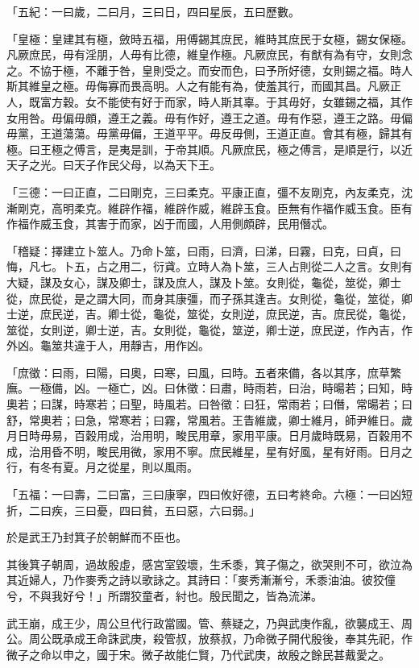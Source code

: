 \begin{pinyinscope}
「五紀：一曰歲，二曰月，三曰日，四曰星辰，五曰歷數。

「皇極：皇建其有極，斂時五福，用傅錫其庶民，維時其庶民于女極，錫女保極。凡厥庶民，毋有淫朋，人毋有比德，維皇作極。凡厥庶民，有猷有為有守，女則念之。不協于極，不離于咎，皇則受之。而安而色，曰予所好德，女則錫之福。時人斯其維皇之極。毋侮寡而畏高明。人之有能有為，使羞其行，而國其昌。凡厥正人，既富方穀。女不能使有好于而家，時人斯其辜。于其毋好，女雖錫之福，其作女用咎。毋偏毋頗，遵王之義。毋有作好，遵王之道。毋有作惡，遵王之路。毋偏毋黨，王道蕩蕩。毋黨毋偏，王道平平。毋反毋側，王道正直。會其有極，歸其有極。曰王極之傅言，是夷是訓，于帝其順。凡厥庶民，極之傅言，是順是行，以近天子之光。曰天子作民父母，以為天下王。

「三德：一曰正直，二曰剛克，三曰柔克。平康正直，彊不友剛克，內友柔克，沈漸剛克，高明柔克。維辟作福，維辟作威，維辟玉食。臣無有作福作威玉食。臣有作福作威玉食，其害于而家，凶于而國，人用側頗辟，民用僭忒。

「稽疑：擇建立卜筮人。乃命卜筮，曰雨，曰濟，曰涕，曰霧，曰克，曰貞，曰悔，凡七。卜五，占之用二，衍貣。立時人為卜筮，三人占則從二人之言。女則有大疑，謀及女心，謀及卿士，謀及庶人，謀及卜筮。女則從，龜從，筮從，卿士從，庶民從，是之謂大同，而身其康彊，而子孫其逢吉。女則從，龜從，筮從，卿士逆，庶民逆，吉。卿士從，龜從，筮從，女則逆，庶民逆，吉。庶民從，龜從，筮從，女則逆，卿士逆，吉。女則從，龜從，筮逆，卿士逆，庶民逆，作內吉，作外凶。龜筮共違于人，用靜吉，用作凶。

「庶徵：曰雨，曰陽，曰奧，曰寒，曰風，曰時。五者來備，各以其序，庶草繁廡。一極備，凶。一極亡，凶。曰休徵：曰肅，時雨若，曰治，時暘若；曰知，時奧若；曰謀，時寒若；曰聖，時風若。曰咎徵：曰狂，常雨若；曰僭，常暘若；曰舒，常奧若；曰急，常寒若；曰霧，常風若。王眚維歲，卿士維月，師尹維日。歲月日時毋易，百穀用成，治用明，畯民用章，家用平康。日月歲時既易，百穀用不成，治用昏不明，畯民用微，家用不寧。庶民維星，星有好風，星有好雨。日月之行，有冬有夏。月之從星，則以風雨。

「五福：一曰壽，二曰富，三曰康寧，四曰攸好德，五曰考終命。六極：一曰凶短折，二曰疾，三曰憂，四曰貧，五曰惡，六曰弱。」

於是武王乃封箕子於朝鮮而不臣也。

其後箕子朝周，過故殷虛，感宮室毀壞，生禾黍，箕子傷之，欲哭則不可，欲泣為其近婦人，乃作麥秀之詩以歌詠之。其詩曰：「麥秀漸漸兮，禾黍油油。彼狡僮兮，不與我好兮！」所謂狡童者，紂也。殷民聞之，皆為流涕。

武王崩，成王少，周公旦代行政當國。管、蔡疑之，乃與武庚作亂，欲襲成王、周公。周公既承成王命誅武庚，殺管叔，放蔡叔，乃命微子開代殷後，奉其先祀，作微子之命以申之，國于宋。微子故能仁賢，乃代武庚，故殷之餘民甚戴愛之。


\end{pinyinscope}
